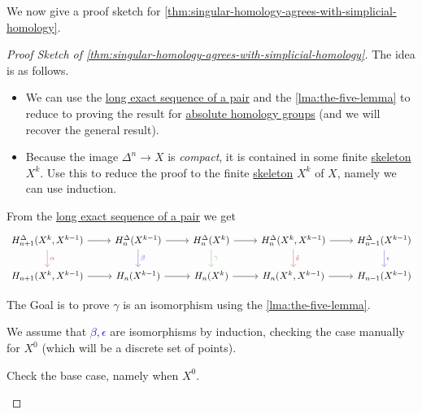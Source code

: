 We now give a proof sketch for \autoref{thm:singular-homology-agrees-with-simplicial-homology}.
\begin{proof}[Proof Sketch of \autoref{thm:singular-homology-agrees-with-simplicial-homology}]
	The idea is as follows.
	\begin{itemize}
		\item We can use the \hyperref[thm:long-exact-sequence-of-a-pair]{long exact sequence of a pair} and the \autoref{lma:the-five-lemma} to
		      reduce to proving the result for \hyperref[def:homology-group]{absolute homology groups} (and we will recover the general result).
		\item Because the image \(\Delta^n \to X\) is \emph{compact}, it is contained in some finite \hyperref[def:skeleton]{skeleton} \(X^k\). Use this
		      to reduce the proof to the finite \hyperref[def:skeleton]{skeleton} \(X^k\) of \(X\), namely we can use induction.
	\end{itemize}
	From the \hyperref[thm:long-exact-sequence-of-a-pair]{long exact sequence of a pair} we get
	\[
		\begin{tikzcd}
			{H^\Delta_{n+1}(X^k, X^{k-1})} & {H^\Delta_{n}(X^{k-1})} & {H^\Delta_{n}(X^{k})} & {H^\Delta_{n}(X^k, X^{k-1})} & {H^\Delta_{n-1}(X^{k-1})} \\
			{H_{n+1}(X^k, X^{k-1})} & {H_{n}(X^{k-1})} & {H_{n}(X^{k})} & {H_{n}(X^k, X^{k-1})} & {H_{n-1}(X^{k-1})}
			\arrow["\alpha", color={rgb,255:red,214;green,92;blue,92}, from=1-1, to=2-1]
			\arrow["\beta", color={rgb,255:red,92;green,92;blue,214}, from=1-2, to=2-2]
			\arrow["\gamma", color={rgb,255:red,124;green,194;blue,112}, from=1-3, to=2-3]
			\arrow["\delta", color={rgb,255:red,214;green,92;blue,92}, from=1-4, to=2-4]
			\arrow["\epsilon", color={rgb,255:red,92;green,92;blue,214}, from=1-5, to=2-5]
			\arrow[from=1-1, to=1-2]
			\arrow[from=1-2, to=1-3]
			\arrow[from=1-3, to=1-4]
			\arrow[from=1-4, to=1-5]
			\arrow[from=2-1, to=2-2]
			\arrow[from=2-2, to=2-3]
			\arrow[from=2-3, to=2-4]
			\arrow[from=2-4, to=2-5]
		\end{tikzcd}
	\]

	The Goal is to prove \(\gamma\) is an isomorphism using the \autoref{lma:the-five-lemma}.

	We assume that \textcolor{blue}{\(\beta, \epsilon \)} are isomorphisms by induction, checking the case manually for \(X^0\)
	(which will be a discrete set of points).
	\begin{exercise}
		Check the base case, namely when \(X^0\).
	\end{exercise}


\end{proof}
